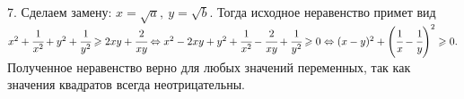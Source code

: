 7. Сделаем замену: $x=\sqrt{a},\ y=\sqrt{b}.$ Тогда исходное неравенство примет вид $x^2+\cfrac{1}{x^2}+y^2+\cfrac{1}{y^2}\geqslant2xy+\cfrac{2}{xy}
\Leftrightarrow x^2-2xy+y^2+\cfrac{1}{x^2}-\cfrac{2}{xy}+\cfrac{1}{y^2}\geqslant0\Leftrightarrow (x-y)^2+\left(\cfrac{1}{x}-\cfrac{1}{y}\right)^2\geqslant0.$ Полученное неравенство верно для любых значений переменных, так как значения квадратов всегда неотрицательны.\\
